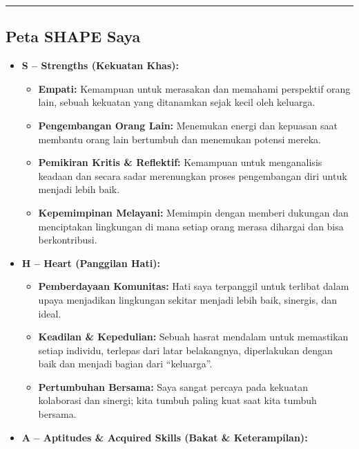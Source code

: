 \documentclass[
  letterpaper,
  DIV=11,
  numbers=noendperiod]{scrreprt}
\providecommand{\tightlist}{%
  \setlength{\itemsep}{0pt}\setlength{\parskip}{0pt}}
\begin{document}
\begin{center}\rule{0.5\linewidth}{0.5pt}\end{center}

\subsection{Peta SHAPE Saya}\label{peta-shape-saya}

\begin{itemize}
\tightlist
\item
  \textbf{S -- Strengths (Kekuatan Khas):}

  \begin{itemize}
  \tightlist
  \item
    \textbf{Empati:} Kemampuan untuk merasakan dan memahami perspektif
    orang lain, sebuah kekuatan yang ditanamkan sejak kecil oleh
    keluarga.
  \item
    \textbf{Pengembangan Orang Lain:} Menemukan energi dan kepuasan saat
    membantu orang lain bertumbuh dan menemukan potensi mereka.
  \item
    \textbf{Pemikiran Kritis \& Reflektif:} Kemampuan untuk menganalisis
    keadaan dan secara sadar merenungkan proses pengembangan diri untuk
    menjadi lebih baik.
  \item
    \textbf{Kepemimpinan Melayani:} Memimpin dengan memberi dukungan dan
    menciptakan lingkungan di mana setiap orang merasa dihargai dan bisa
    berkontribusi.
  \end{itemize}
\item
  \textbf{H -- Heart (Panggilan Hati):}

  \begin{itemize}
  \tightlist
  \item
    \textbf{Pemberdayaan Komunitas:} Hati saya terpanggil untuk terlibat
    dalam upaya menjadikan lingkungan sekitar menjadi lebih baik,
    sinergis, dan ideal.
  \item
    \textbf{Keadilan \& Kepedulian:} Sebuah hasrat mendalam untuk
    memastikan setiap individu, terlepas dari latar belakangnya,
    diperlakukan dengan baik dan menjadi bagian dari ``keluarga''.
  \item
    \textbf{Pertumbuhan Bersama:} Saya sangat percaya pada kekuatan
    kolaborasi dan sinergi; kita tumbuh paling kuat saat kita tumbuh
    bersama.
  \end{itemize}
\item
  \textbf{A -- Aptitudes \& Acquired Skills (Bakat \& Keterampilan):}


\end{itemize}
\end{document}
